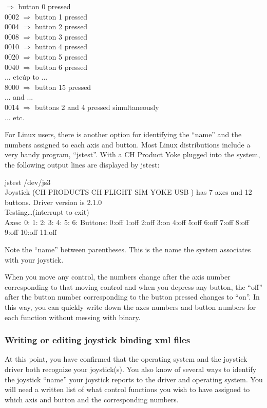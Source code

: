  $\Rightarrow$ button 0 pressed\\
  0002 $\Rightarrow$ button 1 pressed\\
  0004 $\Rightarrow$ button 2 pressed\\
  0008 $\Rightarrow$ button 3 pressed\\
  0010 $\Rightarrow$ button 4 pressed\\
  0020 $\Rightarrow$ button 5 pressed\\
  0040 $\Rightarrow$ button 6 pressed\\
  ... etc\. up to ...\\
  8000 $\Rightarrow$ button 15 pressed\\
  ... and ...\\
  0014 $\Rightarrow$ buttons 2 and 4 pressed simultaneously\\
  ... etc.
  \medskip

For Linux users, there is another option for identifying the ``name'' and the numbers assigned to each axis and button.  Most Linux distributions include a very handy program, ``jstest''.  With a CH Product Yoke plugged into the system, the following output lines are displayed by jstest:
\medskip

\begin{ttfamily}
\tiny
\noindent
jstest /dev/js3\\
Joystick (CH PRODUCTS CH FLIGHT SIM YOKE USB ) has 7 axes and 12 buttons. Driver version is 2.1.0\\
Testing\ldots (interrupt to exit)\\
Axes:  0:   1:   2:  3:  4:  5:  6: Buttons:  0:off  1:off  2:off  3:on  4:off  5:off  6:off  7:off 8:off 9:off 10:off  11:off\\
\end{ttfamily}

\noindent
Note the ``name'' between parentheses.  This is the name the system associates with your joystick.

When you move any control, the numbers change after the axis number corresponding to that moving control and when you depress any button, the ``off'' after the button number corresponding to the button pressed changes to ``on''.  In this way, you can quickly write down the axes numbers and button numbers for each function without messing with binary.  

\subsubsection{Writing or editing joystick binding xml files\label{writing}}
At this point, you have confirmed that the operating system and the joystick driver both recognize your joystick(s).  You also know of several ways to identify the joystick ``name'' your joystick reports to the driver and operating system.  You will need a written list of what control functions you wish to have assigned to which axis and button and the corresponding numbers.  

